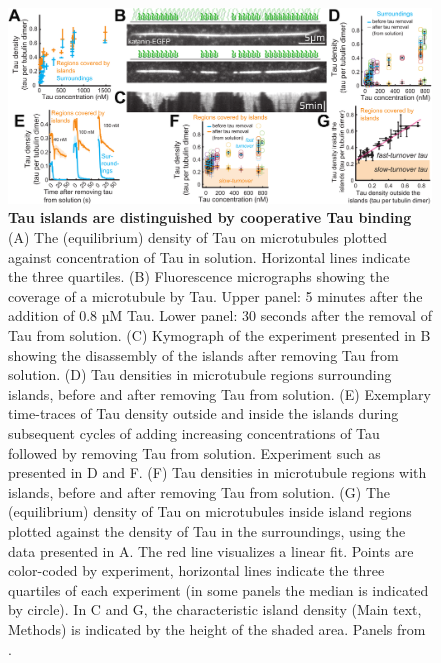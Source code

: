 \begin{figure}[h]
\centering
\includegraphics[width=1\linewidth]{Figures/Tau_flushouts.png}
\caption[Tau islands are distinguished by cooperative Tau binding.]{
\textbf{Tau islands are distinguished by cooperative Tau binding} (A) The (equilibrium) density of Tau on microtubules plotted against concentration of Tau in solution. Horizontal lines indicate the three quartiles. (B) Fluorescence micrographs showing the coverage of a microtubule by Tau. Upper panel: 5 minutes after the addition of 0.8 µM Tau. Lower panel: 30 seconds after the removal of Tau from solution. (C) Kymograph of the experiment presented in B showing the disassembly of the islands after removing Tau from solution. (D) Tau densities in microtubule regions surrounding islands, before and after removing Tau from solution. (E) Exemplary time-traces of Tau density outside and inside the islands during subsequent cycles of adding increasing concentrations of Tau followed by removing Tau from solution. Experiment such as presented in D and F. (F) Tau densities in microtubule regions with islands, before and after removing Tau from solution. (G) The (equilibrium) density of Tau on microtubules inside island regions plotted against the density of Tau in the surroundings, using the data presented in A. The red line visualizes a linear fit. Points are color-coded by experiment, horizontal lines indicate the three quartiles of each experiment (in some panels the median is indicated by circle). In C and G, the characteristic island density (Main text, Methods) is indicated by the height of the shaded area. Panels from \cite{Siahaan2019a}.
	}\label{Tauflushouts}
\end{figure}

